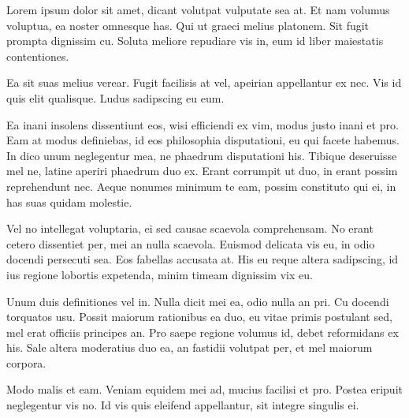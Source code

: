 
Lorem ipsum dolor sit amet, dicant volutpat vulputate sea at. Et nam volumus voluptua, ea noster omnesque has. Qui ut graeci melius platonem. Sit fugit prompta dignissim cu. Soluta meliore repudiare vis in, eum id liber maiestatis contentiones.

Ea sit suas melius verear. Fugit facilisis at vel, apeirian appellantur ex nec. Vis id quis elit qualisque. Ludus sadipscing eu eum.

Ea inani insolens dissentiunt eos, wisi efficiendi ex vim, modus justo inani et pro. Eam at modus definiebas, id eos philosophia disputationi, eu qui facete habemus. In dico unum neglegentur mea, ne phaedrum disputationi his. Tibique deseruisse mel ne, latine aperiri phaedrum duo ex. Erant corrumpit ut duo, in erant possim reprehendunt nec. Aeque nonumes minimum te eam, possim constituto qui ei, in has suas quidam molestie.

Vel no intellegat voluptaria, ei sed causae scaevola comprehensam. No erant cetero dissentiet per, mei an nulla scaevola. Euismod delicata vis eu, in odio docendi persecuti sea. Eos fabellas accusata at. His eu reque altera sadipscing, id ius regione lobortis expetenda, minim timeam dignissim vix eu.

Unum duis definitiones vel in. Nulla dicit mei ea, odio nulla an pri. Cu docendi torquatos usu. Possit maiorum rationibus ea duo, eu vitae primis postulant sed, mel erat officiis principes an. Pro saepe regione volumus id, debet reformidans ex his. Sale altera moderatius duo ea, an fastidii volutpat per, et mel maiorum corpora.

Modo malis et eam. Veniam equidem mei ad, mucius facilisi et pro. Postea eripuit neglegentur vis no. Id vis quis eleifend appellantur, sit integre singulis ei.
